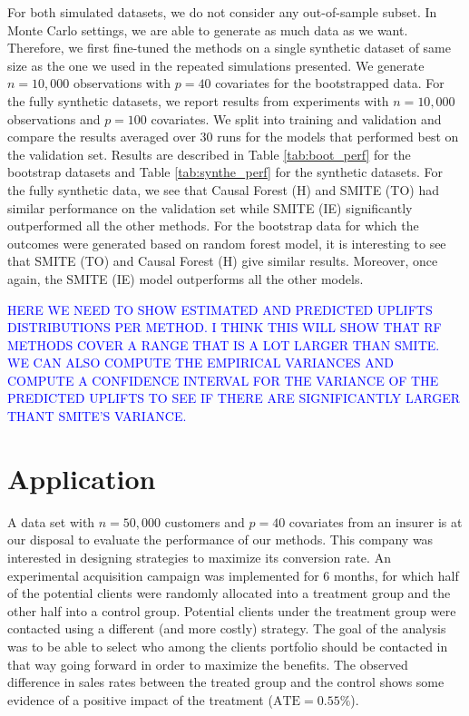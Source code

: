 \documentclass{article}
\begin{document}
For both simulated datasets, we do not consider any out-of-sample subset. In Monte Carlo settings, we are able to generate as much data as we want. Therefore, we first fine-tuned the methods on a single synthetic dataset of same size as the one we used in the repeated simulations presented. We generate $n=10,000$ observations with $p=40$ covariates for the bootstrapped data. For the fully synthetic datasets, we report results from experiments with $n=10,000$ observations and $p=100$ covariates. We split into training and validation and compare the results averaged over $30$ runs for the models that performed best on the validation set. Results are described in Table \ref{tab:boot_perf} for the bootstrap datasets and Table \ref{tab:synthe_perf} for the synthetic datasets. For the fully synthetic data, we see that Causal Forest (H) and SMITE (TO) had similar performance on the validation set while SMITE (IE) significantly outperformed all the other methods. For the bootstrap data for which the outcomes were generated based on random forest model, it is interesting to see that SMITE (TO) and Causal Forest (H) give similar results. Moreover, once again, the SMITE (IE) model outperforms all the other models.



\textcolor{blue}{HERE WE NEED TO SHOW ESTIMATED AND PREDICTED UPLIFTS DISTRIBUTIONS PER METHOD. I THINK THIS WILL SHOW THAT RF METHODS COVER A RANGE THAT IS A LOT LARGER THAN SMITE. WE CAN ALSO COMPUTE THE EMPIRICAL VARIANCES AND COMPUTE A CONFIDENCE INTERVAL FOR THE VARIANCE OF THE PREDICTED UPLIFTS TO SEE IF THERE ARE SIGNIFICANTLY LARGER THANT SMITE'S VARIANCE.}




\section{Application}
\label{sec:application}

A data set with $n=50,000$ customers and $p=40$ covariates from an insurer is at our disposal to evaluate the performance of our methods. This company was interested in designing strategies to maximize its conversion rate. An experimental acquisition campaign was implemented for 6 months, for which half of the potential clients were randomly allocated into a treatment group and the other half into a control group. Potential clients under the treatment group were contacted using a different (and more costly) strategy. The goal of the analysis was to be able to select who among the clients portfolio should be contacted in that way going forward in order to maximize the benefits. The observed difference in sales rates between the treated group and the control shows some evidence of a positive impact of the treatment ($\mathrm{ATE}=0.55\%$).
\end{document}

